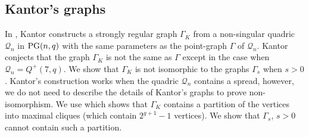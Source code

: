\documentclass[12pt]{article}
\newtheorem{remark}[theorem]{Remark}
\newcommand{\Q}{\mathscr Q}
\newcommand\PG{{\rm PG}}
\begin{document}

\subsection{Kantor's graphs}

In \cite{kantor}, Kantor constructs a strongly regular graph $\Gamma_K$ from a non-singular quadric $\Q_n$ in $\PG(n,q)$ with the same parameters as the point-graph $\Gamma$ of $\Q_n$. 
Kantor conjects that the graph $\Gamma_K$ is  not the same as $\Gamma$ except in the case when $\Q_n=Q^+(7,q)$. We show that $\Gamma_K$ is not isomorphic to the graphs $\Gamma_s$ when $s>0$. Kantor's construction works when the quadric $\Q_n$ contains a spread, however, we do not need to describe the details of Kantor's graphs to prove non-isomorphism.  We use \cite[Lemma 3.3]{kantor} which shows that $\Gamma_K$ contains a partition of the vertices into maximal cliques (which contain $2^{g+1}-1$ vertices). We show that $\Gamma_s$, $s>0$ cannot contain such a partition. 
\end{document}
